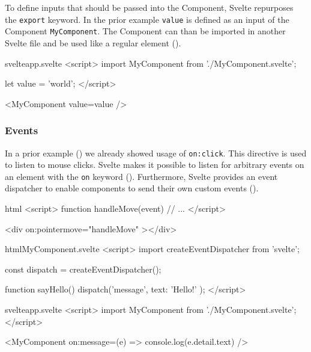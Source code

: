 To define inputs that should be passed into the Component, Svelte repurposes the \texttt{export} keyword. In the prior example \texttt{value} is defined as an input of the Component \texttt{MyComponent}. The Component can than be imported in another Svelte file and be used like a regular element ().

\begin{listing}[H]
\begin{myminted}{svelte}{app.svelte}
<script>
  import MyComponent from './MyComponent.svelte';

  let value = 'world';
</script>

<MyComponent value={value} />
\end{myminted}
\caption{Example usage of a custom Svelte component.}
\label{fig:svelte-component-usage}
\end{listing}

\subsubsection{Events}

In a prior example () we already showed usage of \texttt{on:click}. This directive is used to listen to mouse clicks. Svelte makes it possible to listen for arbitrary events on an element with the \texttt{on} keyword (). Furthermore, Svelte provides an event dispatcher to enable components to send their own custom events ().

\begin{listing}[H]
\begin{myminted}[highlightlines={7}]{html}{}
<script>
  function handleMove(event) {
    // ...
  }
</script>

<div on:pointermove="{handleMove}" ></div>
\end{myminted}
\caption{Usage of the \texttt{on:} directive to listen to \texttt{pointermove} events.}
\label{fig:svelte-on-directive}
\end{listing}


\begin{listing}[H]
\begin{myminted}{html}{MyComponent.svelte}
<script>
  import { createEventDispatcher } from 'svelte';

  const dispatch = createEventDispatcher();

  function sayHello() {
    dispatch('message', { text: 'Hello!' });
  }
</script>
\end{myminted}
\begin{myminted}{svelte}{app.svelte}
<script>
  import MyComponent from './MyComponent.svelte';
</script>

<MyComponent on:message={(e) => console.log(e.detail.text)} />
\end{myminted}
\caption{Usage of the event dispatcher to send custom events.}
\label{fig:svelte-custom-event}
\end{listing}

